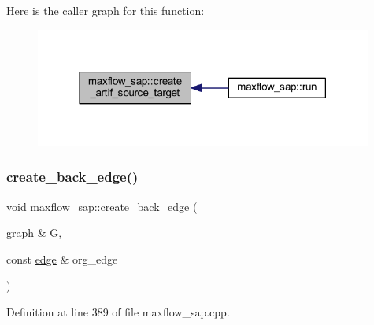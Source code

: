 Here is the caller graph for this function\+:\nopagebreak
\begin{figure}[H]
\begin{center}
\leavevmode
\includegraphics[width=314pt]{classmaxflow__sap_a617016b94a4924fb2574ab87c970d49c_icgraph}
\end{center}
\end{figure}
\mbox{\label{classmaxflow__sap_a4278d120bdbc505abb176f5ca6ba02b3}} 
\subsubsection{\texorpdfstring{create\+\_\+back\+\_\+edge()}{create\_back\_edge()}}
{\footnotesize\ttfamily void maxflow\+\_\+sap\+::create\+\_\+back\+\_\+edge (\begin{DoxyParamCaption}\item[{\mbox{\hyperlink{classgraph}{graph}} \&}]{G,  }\item[{const \mbox{\hyperlink{classedge}{edge}} \&}]{org\+\_\+edge }\end{DoxyParamCaption})\hspace{0.3cm}{\ttfamily [protected]}}



Definition at line 389 of file maxflow\+\_\+sap.\+cpp.



